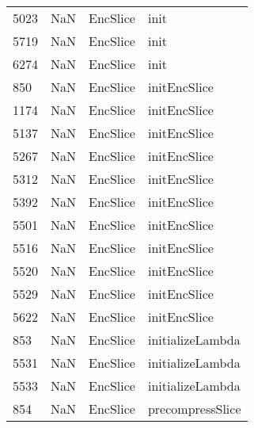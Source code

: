 \begin{tabular}{llll}
5023 &                   NaN &                   EncSlice &                                      init \\
5719 &                   NaN &                   EncSlice &                                      init \\
6274 &                   NaN &                   EncSlice &                                      init \\
850  &                   NaN &                   EncSlice &                              initEncSlice \\
1174 &                   NaN &                   EncSlice &                              initEncSlice \\
5137 &                   NaN &                   EncSlice &                              initEncSlice \\
5267 &                   NaN &                   EncSlice &                              initEncSlice \\
5312 &                   NaN &                   EncSlice &                              initEncSlice \\
5392 &                   NaN &                   EncSlice &                              initEncSlice \\
5501 &                   NaN &                   EncSlice &                              initEncSlice \\
5516 &                   NaN &                   EncSlice &                              initEncSlice \\
5520 &                   NaN &                   EncSlice &                              initEncSlice \\
5529 &                   NaN &                   EncSlice &                              initEncSlice \\
5622 &                   NaN &                   EncSlice &                              initEncSlice \\
853  &                   NaN &                   EncSlice &                          initializeLambda \\
5531 &                   NaN &                   EncSlice &                          initializeLambda \\
5533 &                   NaN &                   EncSlice &                          initializeLambda \\
854  &                   NaN &                   EncSlice &                          precompressSlice \\

\end{tabular}
